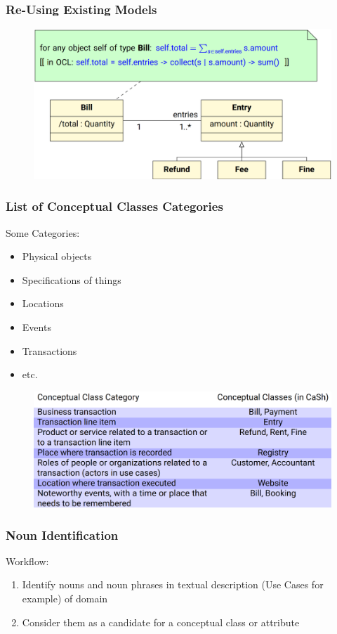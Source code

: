 \documentclass[
../../Software_Engineering_Summary.tex,
]
{subfiles}
\begin{document}
\subsubsection{Re-Using Existing Models}
\begin{figure}[htp]
    \centering
    \includegraphics[scale=0.4]{Pics/ReUsingConceptualClasses.png}
\end{figure}

\subsubsection{List of Conceptual Classes Categories}
Some Categories:
\begin{itemize}
    \item Physical objects
    \item Specifications of things
    \item Locations
    \item Events
    \item Transactions
    \item etc.
\end{itemize}
\begin{figure}[htp]
    \centering
    \includegraphics[scale=0.5]{Pics/CategoryListExample.png}
\end{figure}

\newpage
\subsubsection{Noun Identification}
Workflow:
\begin{enumerate}
    \item Identify nouns and noun phrases in textual description (Use Cases for example) of domain
    \item Consider them as a candidate for a conceptual class or attribute
\end{enumerate}
\end{document}
